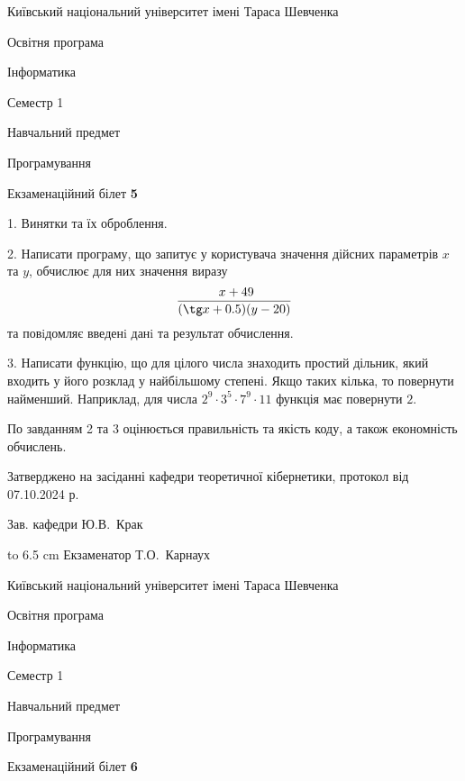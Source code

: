 \documentclass[12pt, ukrainian]{article}
\begin{document}
{{\begin {scriptsize}\par
{ \center  Київський національний університет імені Тараса Шевченка \par}
{\parbox {5 cm}{Освітня програма \hfill}{\parbox {7 cm}{Інформатика\hfill}}\parbox {6 cm}{\hfill Семестр 1}}\par
{\parbox {5 cm} {Навчальний предмет \hfill}\parbox {7 cm}{Програмування \hfill}\parbox {6cm}{\hfill}\par}\vspace{-15pt} \end{scriptsize}}{\center Екзаменаційний білет \No \textbf { 5 }\par}}
{%
1. Винятки та їх оброблення.%
\par
2. Написати програму, що запитує у користувача значення дійсних параметрів $x$ та $y$, обчислює для них значення виразу 
$$\frac{\ x + 49}{(\tg x + 0.5) (y - 20)}$$ 
та повiдомляє введенi данi та результат обчислення.

\par
3. Написати функцію, що для цілого числа знаходить простий дільник, який входить у його розклад у найбільшому степені. Якщо таких кілька, то повернути найменший. Наприклад, для числа $2^{9}{\cdot}3^5{\cdot}7^9{\cdot}11$ функція має повернути $2$.

По завданням 2 та 3 оцінюється правильність та якість коду, а також економність обчислень.

}
{\smallskip\smallskip \begin {scriptsize} Затверджено на засіданні кафедри теоретичної кібернетики, протокол   від   07.10.2024 р.\par\smallskip\smallskip\smallskip\smallskip
{\parbox {6.5 cm} {Зав. кафедри \dotfill Ю.В.~Крак}}\hspace {0.7cm} {\hbox to 6.5 cm { Екзаменатор \dotfill Т.О.~Карнаух}} \end{scriptsize}}
\vspace{0.9cm}
{{\begin {scriptsize}\par
{ \center  Київський національний університет імені Тараса Шевченка \par}
{\parbox {5 cm}{Освітня програма \hfill}{\parbox {7 cm}{Інформатика\hfill}}\parbox {6 cm}{\hfill Семестр 1}}\par
{\parbox {5 cm} {Навчальний предмет \hfill}\parbox {7 cm}{Програмування \hfill}\parbox {6cm}{\hfill}\par}\vspace{-15pt} \end{scriptsize}}{\center Екзаменаційний білет \No \textbf { 6 }\par}}
\end{document}
